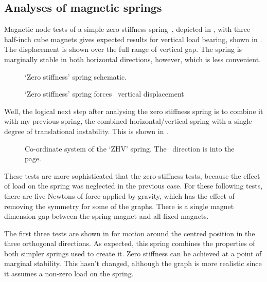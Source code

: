 \documentclass[11pt,a4paper]{memoir}
\begin{document}
\subsection{Analyses of magnetic springs}

Magnetic node tests of a simple zero stiffness
spring~\cite{nijsse2001}, depicted in
, with three half-inch cube magnets
gives expected results for vertical load bearing, shown in
. The displacement is shown over the full
range of vertical gap. The spring is marginally stable in both
horizontal directions, however, which is less convenient.
\begin{figure}
  \caption{`Zero stiffness' spring schematic.}
\end{figure}

\begin{figure}
  \caption{`Zero stiffness' spring forces \vs\ vertical displacement}
\end{figure}




Well, the logical next step after analysing the zero stiffness spring
is to combine it with my previous spring, the combined
horizontal/vertical spring with a single degree of translational
instability. This is shown in .

\begin{figure}
   \caption{Co-ordinate system of the `ZHV' spring. The \y\ direction is into the page.}
\end{figure}

These tests are more sophisticated that the zero-stiffness tests,
because the effect of load on the spring was neglected in the previous
case. For these following tests, there are five Newtons of force
applied by gravity, which has the effect of removing the symmetry for
some of the graphs. There is a single magnet dimension gap between the
spring magnet and all fixed magnets.

The first three tests are shown in
 for motion
around the centred position in the three orthogonal directions. As
expected, this spring combines the properties of both simpler springs
used to create it. Zero stiffness can be achieved at a point of
marginal stability. This hasn't changed, although the graph is more
realistic since it assumes a non-zero load on the spring.
\end{document}
